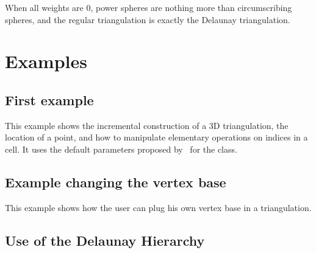 When all weights are 0, power spheres are nothing more than
circumscribing spheres, and the regular triangulation is exactly the
Delaunay triangulation.


\section{Examples}
\label{Triangulation3-sec-examples}
\subsection{First example}
This example shows the incremental construction of a 3D triangulation, 
the location of a point, and how to manipulate elementary operations
on indices in a cell. It uses the default parameters proposed by
\cgal\ for the  class.


\subsection{Example changing the vertex base}
This example shows how the user can plug his own vertex base in a
triangulation.


\subsection{Use of the Delaunay Hierarchy}

